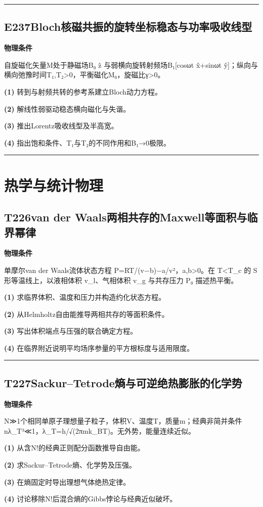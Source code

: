 \documentclass[UTF8,a4paper,11pt,oneside,openany]{ctexbook}
\begin{document}
\par\bigskip\hrule\bigskip
\section*{E237\quad Bloch核磁共振的旋转坐标稳态与功率吸收线型}
\textbf{物理条件}\par 自旋磁化矢量M处于静磁场B₀ ẑ 与弱横向旋转射频场B₁[cosωt x̂+sinωt ŷ]；纵向与横向弛豫时间T₁,T₂>0，平衡磁化M₀，旋磁比γ>0。
\par\noindent\textbf{(1)} 转到与射频共转的参考系建立Bloch动力方程。
\par\noindent\textbf{(2)} 解线性弱驱动稳态横向磁化与失谐。
\par\noindent\textbf{(3)} 推出Lorentz吸收线型及半高宽。
\par\noindent\textbf{(4)} 指出饱和条件、T₁与T₂的不同作用和B₁→0极限。

\par\bigskip\hrule\bigskip
\chapter{热学与统计物理}
\section*{T226\quad van der Waals两相共存的Maxwell等面积与临界幂律}
\textbf{物理条件}\par 单摩尔van der Waals流体状态方程 P=RT/(v−b)−a/v²，a,b>0。在 T<T\_c 的 S形等温线上，以液相体积 v\_l、气相体积 v\_g 与共存压力 P₀ 描述热平衡。
\par\noindent\textbf{(1)} 求临界体积、温度和压力并构造约化状态方程。
\par\noindent\textbf{(2)} 从Helmholtz自由能推导两相共存的等面积条件。
\par\noindent\textbf{(3)} 写出体积端点与压强的联合确定方程。
\par\noindent\textbf{(4)} 在临界附近说明平均场序参量的平方根标度与适用限度。

\par\bigskip\hrule\bigskip
\section*{T227\quad Sackur–Tetrode熵与可逆绝热膨胀的化学势}
\textbf{物理条件}\par N≫1个相同单原子理想量子粒子，体积V、温度T，质量m；经典非简并条件 nλ\_T³≪1，λ\_T=h/√(2πmk\_BT)。无外势，能量连续近似。
\par\noindent\textbf{(1)} 从含N!的经典正则配分函数推导自由能。
\par\noindent\textbf{(2)} 求Sackur–Tetrode熵、化学势及压强。
\par\noindent\textbf{(3)} 在熵固定时导出理想气体绝热定律。
\par\noindent\textbf{(4)} 讨论移除N!后混合熵的Gibbs悖论与经典近似破坏。
\end{document}
